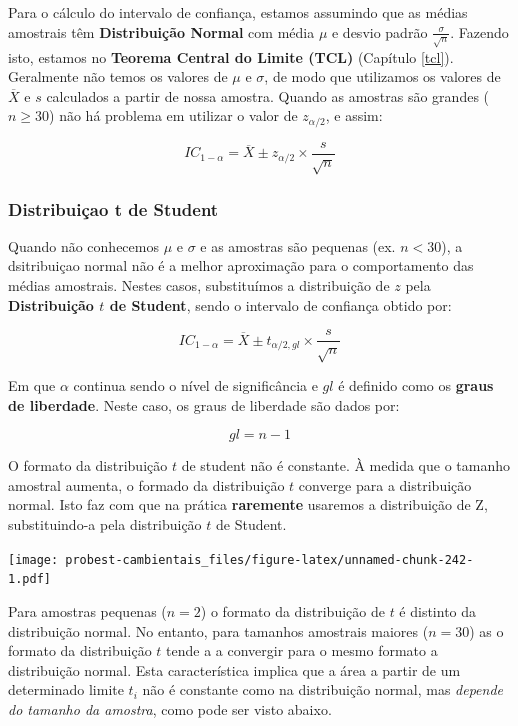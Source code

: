 \documentclass[
]{book}
\begin{document}
Para o cálculo do intervalo de confiança, estamos assumindo que as médias amostrais têm \textbf{Distribuição Normal} com média \(\mu\) e desvio padrão \(\frac{\sigma}{\sqrt{n}}\). Fazendo isto, estamos no \textbf{Teorema Central do Limite (TCL)} (Capítulo \ref{tcl}). Geralmente não temos os valores de \(\mu\) e \(\sigma\), de modo que utilizamos os valores de \(\overline{X}\) e \(s\) calculados a partir de nossa amostra. Quando as amostras são grandes (\(n\ge{30}\)) não há problema em utilizar o valor de \(z_{\alpha/2}\), e assim:

\[IC_{1-\alpha} = \overline{X} \pm z_{\alpha/2} \times \frac{s}{\sqrt{n}}\]

\hypertarget{distribuiuxe7ao-t-de-student}{%
\subsubsection{Distribuiçao t de Student}\label{distribuiuxe7ao-t-de-student}}

Quando não conhecemos \(\mu\) e \(\sigma\) e as amostras são pequenas (ex. \(n<30\)), a dsitribuiçao normal não é a melhor aproximação para o comportamento das médias amostrais. Nestes casos, substituímos a distribuição de \(z\) pela \textbf{Distribuição \(t\) de Student}, sendo o intervalo de confiança obtido por:

\[IC_{1-\alpha} = \overline{X} \pm t_{\alpha/2, gl} \times \frac{s}{\sqrt{n}}\]

Em que \(\alpha\) continua sendo o nível de significância e \(gl\) é definido como os \textbf{graus de liberdade}. Neste caso, os graus de liberdade são dados por:

\[gl = n-1\]

O formato da distribuição \(t\) de student não é constante. À medida que o tamanho amostral aumenta, o formado da distribuição \(t\) converge para a distribuição normal. Isto faz com que na prática \textbf{raremente} usaremos a distribuição de Z, substituindo-a pela distribuição \(t\) de Student.

\texttt{[image: probest-cambientais\_files/figure-latex/unnamed-chunk-242-1.pdf]}

Para amostras pequenas (\(n = 2\)) o formato da distribuição de \(t\) é distinto da distribuição normal. No entanto, para tamanhos amostrais maiores (\(n = 30\)) as o formato da distribuição \(t\) tende a a convergir para o mesmo formato a distribuição normal. Esta característica implica que a área a partir de um determinado limite \(t_i\) não é constante como na distribuição normal, mas \emph{depende do tamanho da amostra}, como pode ser visto abaixo.
\end{document}
